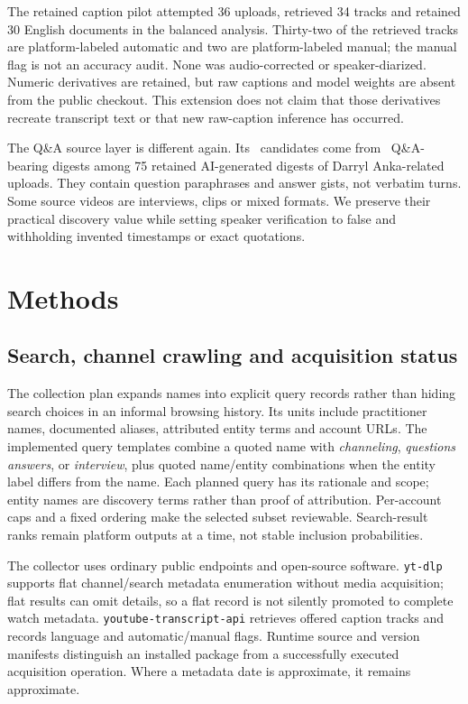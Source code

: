 The retained caption pilot attempted 36 uploads, retrieved 34 tracks and retained 30 English documents in the balanced analysis. Thirty-two of the retrieved tracks are platform-labeled automatic and two are platform-labeled manual; the manual flag is not an accuracy audit. None was audio-corrected or speaker-diarized. Numeric derivatives are retained, but raw captions and model weights are absent from the public checkout. This extension does not claim that those derivatives recreate transcript text or that new raw-caption inference has occurred.

The Q\&A source layer is different again. Its \QAN\ candidates come from \QAVideoN\ Q\&A-bearing digests among 75 retained AI-generated digests of Darryl Anka-related uploads. They contain question paraphrases and answer gists, not verbatim turns. Some source videos are interviews, clips or mixed formats. We preserve their practical discovery value while setting speaker verification to false and withholding invented timestamps or exact quotations.

\section{Methods}
\subsection{Search, channel crawling and acquisition status}
The collection plan expands names into explicit query records rather than hiding search choices in an informal browsing history. Its units include practitioner names, documented aliases, attributed entity terms and account URLs. The implemented query templates combine a quoted name with \emph{channeling}, \emph{questions answers}, or \emph{interview}, plus quoted name/entity combinations when the entity label differs from the name. Each planned query has its rationale and scope; entity names are discovery terms rather than proof of attribution. Per-account caps and a fixed ordering make the selected subset reviewable. Search-result ranks remain platform outputs at a time, not stable inclusion probabilities.

The collector uses ordinary public endpoints and open-source software. \texttt{yt-dlp} supports flat channel/search metadata enumeration without media acquisition; flat results can omit details, so a flat record is not silently promoted to complete watch metadata. \texttt{youtube-transcript-api} retrieves offered caption tracks and records language and automatic/manual flags. Runtime source and version manifests distinguish an installed package from a successfully executed acquisition operation. Where a metadata date is approximate, it remains approximate.

